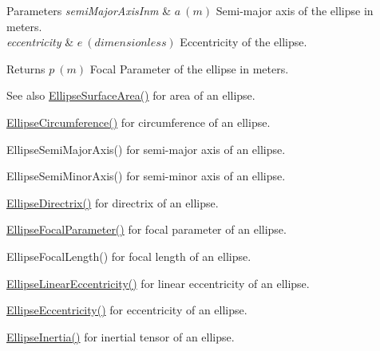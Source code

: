 \begin{DoxyParams}{Parameters}
{\em semi\+Major\+Axis\+Inm} & $ a\ (m)$ Semi-\/major axis of the ellipse in meters. \\
\hline
{\em eccentricity} & $ e\ (dimensionless)$ Eccentricity of the ellipse. \\
\hline
\end{DoxyParams}
\begin{DoxyReturn}{Returns}
$ p\ (m)$ Focal Parameter of the ellipse in meters. 
\end{DoxyReturn}
\begin{DoxySeeAlso}{See also}
\mbox{\hyperlink{group___e_g_x_math-_geometry-2_d-_ellipse-_surface_area_ga4ce8c8323e9718ce5458f4ab7f6d823d}{Ellipse\+Surface\+Area()}} for area of an ellipse. 

\mbox{\hyperlink{group___e_g_x_math-_geometry-2_d-_ellipse-_circumference_ga4172802ac674eb53467b44928ac635c7}{Ellipse\+Circumference()}} for circumference of an ellipse. 

Ellipse\+Semi\+Major\+Axis() for semi-\/major axis of an ellipse. 

Ellipse\+Semi\+Minor\+Axis() for semi-\/minor axis of an ellipse. 

\mbox{\hyperlink{group___e_g_x_math-_geometry-2_d-_ellipse-_directrix_gace8f72a8efbc9c18d3eb689151405106}{Ellipse\+Directrix()}} for directrix of an ellipse. 

\mbox{\hyperlink{group___e_g_x_math-_geometry-2_d-_ellipse-_focal_parameter_ga4cd01a38c72c092ef9791351948bf69b}{Ellipse\+Focal\+Parameter()}} for focal parameter of an ellipse. 

Ellipse\+Focal\+Length() for focal length of an ellipse. 

\mbox{\hyperlink{group___e_g_x_math-_geometry-2_d-_ellipse-_linear_eccentricity_gac70b3010e30aa8b73deb50fe2b9b9a91}{Ellipse\+Linear\+Eccentricity()}} for linear eccentricity of an ellipse. 

\mbox{\hyperlink{group___e_g_x_math-_geometry-2_d-_ellipse-_eccentricity_ga6a0a7fba17f782616894cfc447628c33}{Ellipse\+Eccentricity()}} for eccentricity of an ellipse. 

\mbox{\hyperlink{group___e_g_x_math-_geometry-2_d-_ellipse-_inertia_ga10a3049c2f04b50f271fb01dc62e4cf8}{Ellipse\+Inertia()}} for inertial tensor of an ellipse. 
\end{DoxySeeAlso}
\mbox{\label{group___e_g_x_math-_geometry-2_d-_ellipse-_focal_parameter_ga61d3b31a8a32b43634b2ea89a83bc6a5}} 

